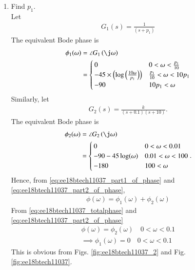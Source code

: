 \begin{enumerate}[label=\thesubsection.\arabic*.,ref=\thesubsection.\theenumi]
\item Find  $p_1$.
\\
\solution 
Let 
\begin{align}
\label{eq:ee18btech11037_g1}
G_1(s) = \frac{1}{(s+{p_1})}
\end{align}
%
The equivalent Bode phase is
\begin{align}
\begin{split}
\label{eq:ee18btech11037_part1_of_phase}
 \phi _1(\omega) &= \angle G_1\brak{\j\omega}
\\
&= 
 \begin{cases} 
        0 & 0<\omega< \frac{p_1}{10} \\
      -45\times\brak{\log\brak{\frac{10\omega}{p_1}}}& \frac{p_1}{10}<\omega<10p_1 \\
      -90 & 10p_1<\omega  
 \end{cases}
\end{split}
\end{align}
%
Similarly, let
\begin{align}
\label{eq:ee18btech11037_g2}
G_2(s) = \frac{k}{(s+0.1)(s+10)}.
\end{align}
%
The equivalent Bode phase is
%
\begin{align}
\label{eq:ee18btech11037_part2_of_phase}
\begin{split}
 \phi_2(\omega) &=  \angle G_2\brak{\j\omega}
\\
&=
 \begin{cases} 
        0 & 0<\omega<0.01 \\
      -90-45\log(\omega)& 0.01<\omega<100 \\
      -180 & 100<\omega  
 \end{cases}.
\end{split}
\end{align}
Hence, from  \eqref{eq:ee18btech11037_part1_of_phase} and \eqref{eq:ee18btech11037_part2_of_phase},
\begin{align}
\phi(\omega) = \phi_1(\omega) + \phi_2(\omega) 
\end{align} 
From \eqref{eq:ee18btech11037_totalphase} and \eqref{eq:ee18btech11037_part2_of_phase}
\begin{align}
\phi(\omega) = \phi_2(\omega)  \quad   0<\omega<0.1 \\
\label{eq:ee18btech11037_phi1}
\implies \phi_1(\omega) = 0 \quad  0<\omega<0.1 
\end{align}
%
This is obvious from Figs. \ref{fig:ee18btech11037_2} and Fig. \ref{fig:ee18btech11037}.

\end{enumerate}
